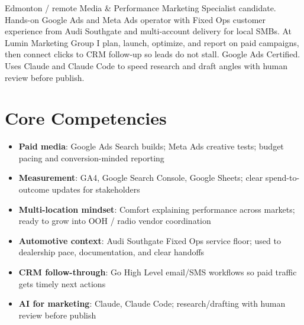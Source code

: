 \documentclass[11pt,a4paper,sans]{moderncv}
\begin{document}
\makecvtitle

\vspace{6pt}
\small{Edmonton / remote Media \& Performance Marketing Specialist candidate. Hands-on Google Ads and Meta Ads operator with Fixed Ops customer experience from Audi Southgate and multi-account delivery for local SMBs. At Lumin Marketing Group I plan, launch, optimize, and report on paid campaigns, then connect clicks to CRM follow-up so leads do not stall. Google Ads Certified. Uses Claude and Claude Code to speed research and draft angles with human review before publish.}

\section{Core Competencies}
\vspace{1pt}
\begin{itemize}
\item \textbf{Paid media}: Google Ads Search builds; Meta Ads creative tests; budget pacing and conversion-minded reporting
\item \textbf{Measurement}: GA4, Google Search Console, Google Sheets; clear spend-to-outcome updates for stakeholders
\item \textbf{Multi-location mindset}: Comfort explaining performance across markets; ready to grow into OOH / radio vendor coordination
\item \textbf{Automotive context}: Audi Southgate Fixed Ops service floor; used to dealership pace, documentation, and clear handoffs
\item \textbf{CRM follow-through}: Go High Level email/SMS workflows so paid traffic gets timely next actions
\item \textbf{AI for marketing}: Claude, Claude Code; research/drafting with human review before publish
\end{itemize}
\end{document}
